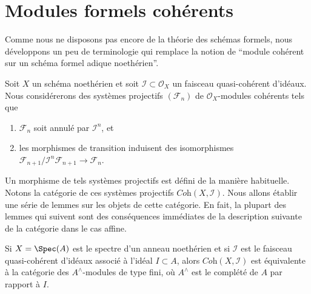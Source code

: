 \section{Modules formels cohérents}
\label{section-coherent-formal}

\noindent
Comme nous ne disposons pas encore de la théorie des schémas formels, nous développons
un peu de terminologie qui remplace la notion de ``module cohérent sur un
schéma formel adique noethérien''.

\medskip\noindent
Soit $X$ un schéma noethérien et soit $\mathcal{I} \subset \mathcal{O}_X$
un faisceau quasi-cohérent d'idéaux. Nous considérerons des systèmes
projectifs $(\mathcal{F}_n)$ de $\mathcal{O}_X$-modules cohérents tels que
\begin{enumerate}
\item $\mathcal{F}_n$ soit annulé par $\mathcal{I}^n$, et
\item les morphismes de transition induisent des isomorphismes
$\mathcal{F}_{n + 1}/\mathcal{I}^n\mathcal{F}_{n + 1} \to \mathcal{F}_n$.
\end{enumerate}
Un morphisme de tels systèmes projectifs est défini de la
manière habituelle. Notons la catégorie de ces systèmes projectifs
$\textit{Coh}(X, \mathcal{I})$. Nous allons établir une série de lemmes
sur les objets de cette catégorie. En fait, la plupart des
lemmes qui suivent sont des conséquences immédiates de la description
suivante de la catégorie dans le cas affine.

\begin{lemma}
\label{lemma-inverse-systems-affine}
Si $X = \Spec(A)$ est le spectre d'un anneau noethérien et si
$\mathcal{I}$ est le faisceau quasi-cohérent d'idéaux associé à l'idéal
$I \subset A$, alors $\textit{Coh}(X, \mathcal{I})$ est équivalente à
la catégorie des $A^\wedge$-modules de type fini, où $A^\wedge$ est le complété
de $A$ par rapport à $I$.
\end{lemma}

